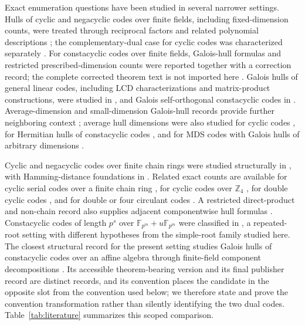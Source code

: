 \documentclass[11pt]{article}
\newcommand{\F}{\mathbb F}
\theoremstyle{plain}
\theoremstyle{definition}
\theoremstyle{remark}
\begin{document}
Exact enumeration questions have been studied in several narrower settings. Hulls of cyclic and negacyclic codes over finite fields, including fixed-dimension counts, were treated through reciprocal factors and related polynomial descriptions \cite{sangwisut2015}; the complementary-dual case for cyclic codes was characterized separately \cite{yangMassey1994}. For constacyclic codes over finite fields, Galois-hull formulas and restricted prescribed-dimension counts were reported together with a correction record; the complete corrected theorem text is not imported here \cite{debnathConstacyclic2023,debnathCorrection2023}. Galois hulls of general linear codes, including LCD characterizations and matrix-product constructions, were studied in \cite{liuPan2020}, and Galois self-orthogonal constacyclic codes in \cite{fuLiu2022}. Average-dimension and small-dimension Galois-hull records provide further neighboring context \cite{debnathAverage2025,debnathSmall2026}; average hull dimensions were also studied for cyclic codes \cite{skersys2003}, for Hermitian hulls of constacyclic codes \cite{jitmanSangwisut2018}, and for MDS codes with Galois hulls of arbitrary dimensions \cite{cao2020}.

Cyclic and negacyclic codes over finite chain rings were studied structurally in \cite{dinhLopezPermouth2004}, with Hamming-distance foundations in \cite{nortonSalagean2000}. Related exact counts are available for cyclic serial codes over a finite chain ring \cite{talbi2021}, for cyclic codes over $\mathbb Z_4$ \cite{jitmanZ4,pathakZ4}, for double cyclic codes \cite{gao2023}, and for double or four circulant codes \cite{aliabadi2026}. A restricted direct-product and non-chain record also supplies adjacent componentwise hull formulas \cite{zhang2026}. Constacyclic codes of length $p^s$ over $\F_{p^m}+u\F_{p^m}$ were classified in \cite{dinh2010}, a repeated-root setting with different hypotheses from the simple-root family studied here. The closest structural record for the present setting studies Galois hulls of constacyclic codes over an affine algebra through finite-field component decompositions \cite{debnathAffinePreprint,debnathAffine2026}. Its accessible theorem-bearing version and its final publisher record are distinct records, and its convention places the candidate in the opposite slot from the convention used below; we therefore state and prove the convention transformation rather than silently identifying the two dual codes. Table~\ref{tab:literature} summarizes this scoped comparison.
\end{document}

